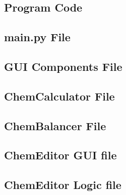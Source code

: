 \documentclass[a4paper,12pt]{article}
\begin{document}
\begin{appendices}

\section{Program Code}

\subsection{main.py File}




\subsection{GUI Components File}




\newpage

\subsection{ChemCalculator File}


\newpage

\subsection{ChemBalancer File}



\newpage

\subsection{ChemEditor GUI file}



\newpage

\subsection{ChemEditor Logic file}


\end{appendices}
\end{document}
